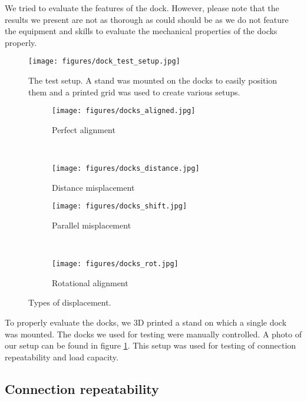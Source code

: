 We tried to evaluate the features of the dock. However, please note that the
results we present are not as thorough as could should be as we do not feature
the equipment and skills to evaluate the mechanical properties of the docks
properly.

\begin{figure}[!t]
    \centering
    \texttt{[image: figures/dock\_test\_setup.jpg]}
    \caption{The test setup. A stand was mounted on the docks to easily position
    them and a printed grid was used to create various setups.}
    \label{fig:dock_test_setup}
\end{figure}

\begin{figure}[!t]
    \centering
    \begin{subfigure}[b]{0.45\textwidth}
        \texttt{[image: figures/docks\_aligned.jpg]}
        \caption{Perfect alignment}
        \label{fig:dock_test_aligned}
    \end{subfigure}
    ~
    \begin{subfigure}[b]{0.45\textwidth}
        \texttt{[image: figures/docks\_distance.jpg]}
        \caption{Distance misplacement}
        \label{fig:dock_test_distance}
    \end{subfigure}

    \begin{subfigure}[b]{0.45\textwidth}
        \texttt{[image: figures/docks\_shift.jpg]}
        \caption{Parallel misplacement}
        \label{fig:dock_test_parallel}
    \end{subfigure}
    ~
    \begin{subfigure}[b]{0.45\textwidth}
        \texttt{[image: figures/docks\_rot.jpg]}
        \caption{Rotational alignment}
        \label{fig:dock_test_rot}
    \end{subfigure}

    \caption{Types of displacement.}
    \label{fig:dock_diplacement}
\end{figure}

To properly evaluate the docks, we 3D printed a stand on which a single dock was
mounted. The docks we used for testing were manually controlled. A photo of our
setup can be found in figure \ref{fig:dock_test_setup}. This setup was used for
testing of connection repeatability and load capacity.

\subsection{Connection repeatability}

